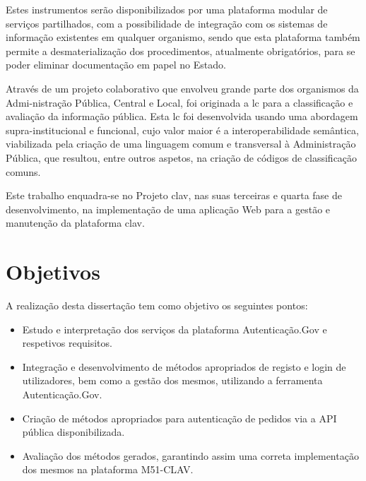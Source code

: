 Estes instrumentos serão disponibilizados por uma plataforma modular de serviços partilhados, com a possibilidade de integração com os sistemas de informação existentes em qualquer organismo, sendo que esta plataforma também permite a desmaterialização dos procedimentos, atualmente obrigatórios, para se poder eliminar documentação em papel no Estado.

Através de um projeto colaborativo que envolveu grande parte dos organismos da Admi-nistração Pública, Central e Local, foi originada a \gls{lc} para a classificação e avaliação da informação pública. Esta \gls{lc} foi desenvolvida usando uma abordagem supra-institucional e funcional, cujo valor maior é a interoperabilidade semântica, viabilizada pela criação de uma linguagem comum e transversal à Administração Pública, que resultou, entre outros aspetos, na criação de códigos de classificação comuns.

Este trabalho enquadra-se no Projeto \gls{clav}, nas suas terceiras e quarta fase de desenvolvimento, na implementação de uma aplicação Web para a gestão e manutenção da plataforma \gls{clav}. 


\cleardoublepage
\section{Objetivos}

A realização desta dissertação tem como objetivo os seguintes pontos:

\begin{itemize}
    \item Estudo e interpretação dos serviços da plataforma Autenticação.Gov e respetivos requisitos.
    \item Integração e desenvolvimento de métodos apropriados de registo e login de utilizadores, bem como a gestão dos mesmos, utilizando a ferramenta Autenticação.Gov.
    \item Criação de métodos apropriados para autenticação de pedidos via a API pública disponibilizada.
    \item Avaliação dos métodos gerados, garantindo assim uma correta implementação dos mesmos na plataforma M51-CLAV.
\end{itemize}

